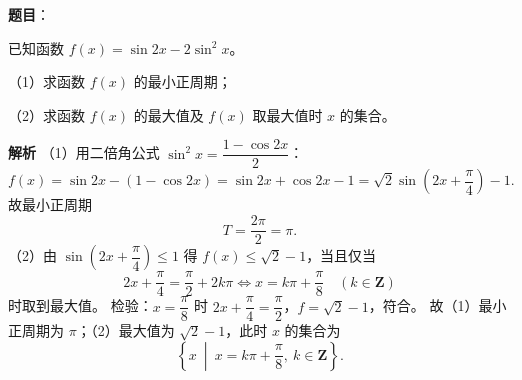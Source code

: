 \begin{answer}

\textbf{题目}：

已知函数 $f(x)=\sin2x-2\sin^2x$。

（1）求函数 $f(x)$ 的最小正周期；

（2）求函数 $f(x)$ 的最大值及 $f(x)$ 取最大值时 $x$ 的集合。

\textbf{解析}
（1）用二倍角公式 $\sin^2x=\dfrac{1-\cos2x}{2}$：
\nopagebreak[4]
\[f(x)=\sin2x-\left(1-\cos2x\right)=\sin2x+\cos2x-1=\sqrt2\sin\left(2x+\frac\pi4\right)-1.\]
故最小正周期
\nopagebreak[4]
\[T=\frac{2\pi}{2}=\pi.\]
（2）由 $\sin\left(2x+\dfrac\pi4\right)\leqslant1$ 得 $f(x)\leqslant\sqrt2-1$，当且仅当
\nopagebreak[4]
\[2x+\frac\pi4=\frac\pi2+2k\pi\iff x=k\pi+\frac\pi8\quad(k\in\mathbf Z)\]
时取到最大值。
检验：$x=\dfrac\pi8$ 时 $2x+\dfrac\pi4=\dfrac\pi2$，$f=\sqrt2-1$，符合。
故（1）最小正周期为 $\pi$；（2）最大值为 $\sqrt2-1$，此时 $x$ 的集合为
\nopagebreak[4]
\[\left\{x\ \middle|\ x=k\pi+\frac\pi8,\ k\in\mathbf Z\right\}.\]


\end{answer}
